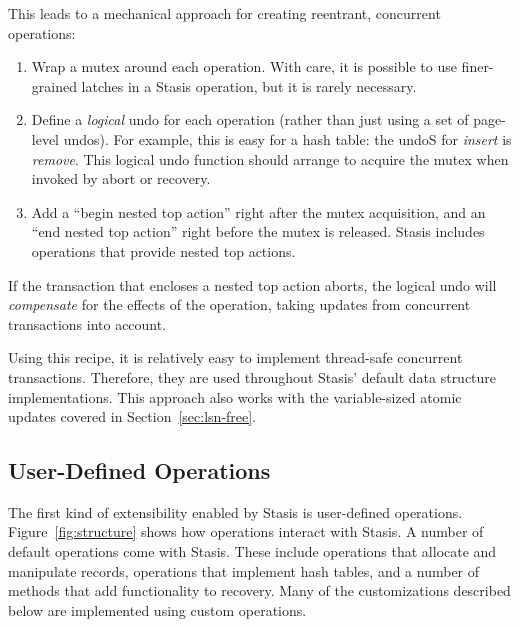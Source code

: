 \documentclass[letterpaper,twocolumn,10pt]{article}
\newcommand{\yad}{Stasis\xspace}
\newcommand{\yads}{Stasis'\xspace}
\begin{document}
This leads to a mechanical approach for creating reentrant, concurrent
operations:

\begin{enumerate}
\item Wrap a mutex around each operation.  With care, it is possible 
  to use finer-grained latches in a \yad operation, but it is rarely necessary.
\item Define a {\em logical} undo for each operation (rather than just
  using a set of page-level undos).  For example, this is easy for a
  hash table: the undoS for {\em insert} is {\em remove}.  This logical
  undo function should arrange to acquire the mutex when invoked by
  abort or recovery.
\item Add a ``begin nested top action'' right after the mutex
  acquisition, and an ``end nested top action'' right before the mutex
  is released.  \yad includes operations that provide nested top
  actions.
\end{enumerate}

If the transaction that encloses a nested top action aborts, the
logical undo will {\em compensate} for the effects of the operation, 
taking updates from concurrent transactions into account.

Using this recipe, it is relatively easy to implement thread-safe
concurrent transactions.  Therefore, they are used throughout \yads
default data structure implementations.  This approach also works 
with the variable-sized atomic updates covered in Section~\ref{sec:lsn-free}.





\subsection{User-Defined Operations}
\label{sec:operations}

The first kind of extensibility enabled by \yad is user-defined operations.
Figure~\ref{fig:structure} shows how operations interact with \yad.  A
number of default operations come with \yad.  These include operations
that allocate and manipulate records, operations that implement hash
tables, and a number of methods that add functionality to recovery.
Many of the customizations described below are implemented using
custom operations. 
\end{document}
